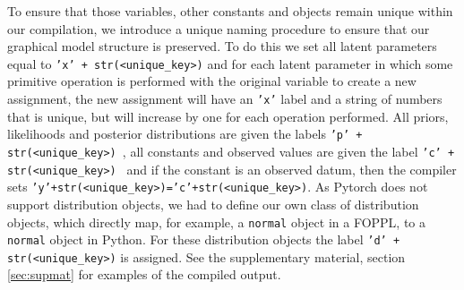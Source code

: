 To ensure that those variables, other constants and objects remain unique within our compilation, we introduce a unique naming procedure to ensure that our graphical model structure is preserved.  To do this we set all latent parameters equal to \texttt{'x' + str(<unique_key>)} and for each latent parameter in which some primitive operation is performed with the original variable to create a new assignment, the new assignment will have an \texttt{'x'} label and a string of numbers that is unique, but will increase by one for each operation performed. All priors, likelihoods and posterior distributions are given the labels \texttt{'p' + str(<unique_key>) }, all constants and observed values are given the label \texttt{'c' + str(<unique_key>) } and if the constant is an observed datum, then the compiler sets  \texttt{'y'+str(<unique_key>)='c'+str(<unique_key>)}. As Pytorch does not support distribution objects, we had to define our own class of distribution objects, which directly map, for example, a \texttt{normal} object in a FOPPL, to a \texttt{normal} object in Python. For these distribution objects the label \texttt{'d' + str(<unique_key>)} is assigned. See the supplementary material, section \ref{sec:supmat} for examples of the compiled output.